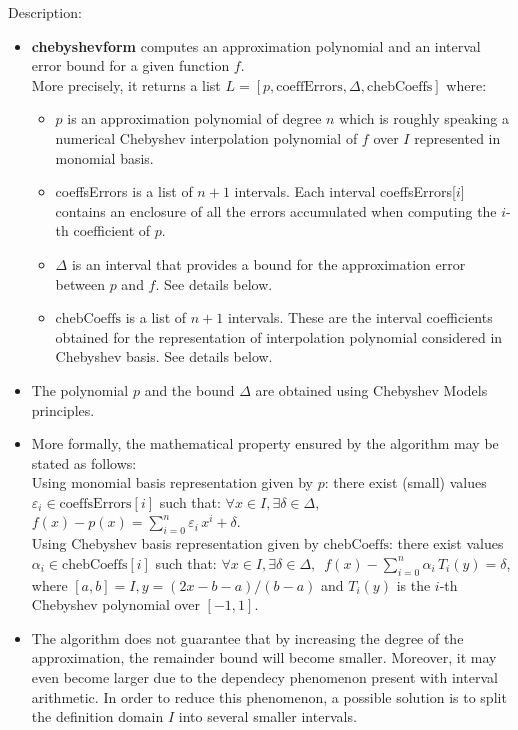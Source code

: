 \noindent Description: \begin{itemize}

\item \textbf{chebyshevform} computes an approximation polynomial and an interval error bound
   for a given function $f$. 
   \\
   More precisely, it returns a list $L = \left[p, \textrm{coeffErrors},\Delta,\textrm{chebCoeffs} \right]$
   where:
   \begin{itemize}
   \item $p$ is an approximation polynomial of degree $n$ 
   which is roughly speaking a numerical Chebyshev interpolation polynomial 
   of $f$ over $I$ represented in monomial basis.
   \item coeffsErrors is a list of $n+1$ intervals. Each 
   interval coeffsErrors[$i$] contains an enclosure of all the 
   errors accumulated when computing the $i$-th coefficient of $p$.
   \item $\Delta$ is an interval that provides a bound for the 
   approximation error between $p$ and $f$. See details below.
   \item $\textrm{chebCoeffs}$ is a list of 
   $n+1$ intervals. These are the interval coefficients obtained for 
   the representation of interpolation polynomial considered in Chebyshev 
   basis. See details below.
   \end{itemize}

\item The polynomial $p$ and the bound $\Delta$ are obtained
   using Chebyshev Models principles.

\item More formally, the mathematical property ensured by the algorithm may be
   stated as follows:
   \\
   Using monomial basis representation given by $p$: there exist 
   (small) values $\varepsilon_i \in \textrm{coeffsErrors}[i]$ 
   such that:
   $\forall x \in I, \exists \delta \in \Delta,\,$
   $f(x)-p(x) = \sum\limits_{i=0}^{n} \varepsilon_i\, x^i + \delta$.
   \\
   Using Chebyshev basis representation given by $\textrm{chebCoeffs}$: 
   there exist values $\alpha_i \in \textrm{chebCoeffs}[i]$ 
   such that:
   $\forall x \in I, \exists \delta \in \Delta,\,$
   $f(x)-\sum\limits_{i=0}^{n} \alpha_i\, T_i(y)= \delta$, 
   where $[a,b]=I, y=(2x-b-a)/(b-a)$ and  $T_i(y)$ 
   is the $i$-th Chebyshev polynomial over $[-1,1]$.

\item The algorithm does not guarantee that by increasing the degree of the
   approximation, the remainder bound will become smaller. Moreover, it may 
   even become larger due to the dependecy phenomenon present with interval
   arithmetic. In order to reduce this phenomenon, a possible solution is to
   split the definition domain $I$ into several smaller intervals. 
\end{itemize}
